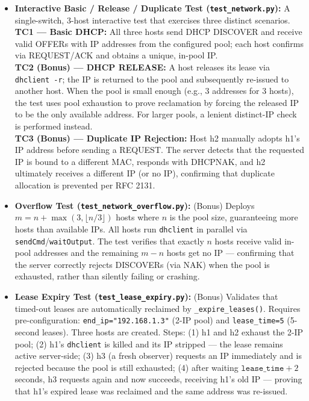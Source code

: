 \documentclass[12pt,a4paper]{article}
\begin{document}
\begin{itemize}[leftmargin=1.5cm]
    \item \textbf{Interactive Basic / Release / Duplicate Test (\texttt{test\_network.py}):} A single-switch, 3-host interactive test that exercises three distinct scenarios.\\
    \textbf{TC1 --- Basic DHCP:} All three hosts send DHCP DISCOVER and receive valid OFFERs with IP addresses from the configured pool; each host confirms via REQUEST/ACK and obtains a unique, in-pool IP.\\
    \textbf{TC2 (Bonus) --- DHCP RELEASE:} A host releases its lease via \texttt{dhclient -r}; the IP is returned to the pool and subsequently re-issued to another host. When the pool is small enough (e.g., 3 addresses for 3 hosts), the test uses pool exhaustion to prove reclamation by forcing the released IP to be the only available address. For larger pools, a lenient distinct-IP check is performed instead.\\
    \textbf{TC3 (Bonus) --- Duplicate IP Rejection:} Host h2 manually adopts h1's IP address before sending a REQUEST. The server detects that the requested IP is bound to a different MAC, responds with DHCPNAK, and h2 ultimately receives a different IP (or no IP), confirming that duplicate allocation is prevented per RFC 2131.
    \item \textbf{Overflow Test (\texttt{test\_network\_overflow.py}):} (Bonus) Deploys $m = n + \max(3, \lfloor n/3 \rfloor)$ hosts where $n$ is the pool size, guaranteeing more hosts than available IPs. All hosts run \texttt{dhclient} in parallel via \texttt{sendCmd}/\texttt{waitOutput}. The test verifies that exactly $n$ hosts receive valid in-pool addresses and the remaining $m-n$ hosts get no IP --- confirming that the server correctly rejects DISCOVERs (via NAK) when the pool is exhausted, rather than silently failing or crashing.
    \item \textbf{Lease Expiry Test (\texttt{test\_lease\_expiry.py}):} (Bonus) Validates that timed-out leases are automatically reclaimed by \texttt{\_expire\_leases()}. Requires pre-configuration: \texttt{end\_ip="192.168.1.3"} (2-IP pool) and \texttt{lease\_time=5} (5-second leases). Three hosts are created. Steps: (1) h1 and h2 exhaust the 2-IP pool; (2) h1's \texttt{dhclient} is killed and its IP stripped --- the lease remains active server-side; (3) h3 (a fresh observer) requests an IP immediately and is rejected because the pool is still exhausted; (4) after waiting $\texttt{lease\_time}+2$ seconds, h3 requests again and now succeeds, receiving h1's old IP --- proving that h1's expired lease was reclaimed and the same address was re-issued.
\end{itemize}
\end{document}

